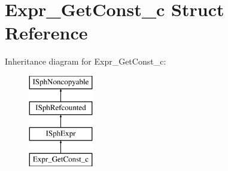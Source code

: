 \hypertarget{structExpr__GetConst__c}{\section{Expr\-\_\-\-Get\-Const\-\_\-c Struct Reference}
\label{structExpr__GetConst__c}
}
Inheritance diagram for Expr\-\_\-\-Get\-Const\-\_\-c\-:\begin{figure}[H]
\begin{center}
\leavevmode
\includegraphics[height=4.000000cm]{structExpr__GetConst__c}
\end{center}
\end{figure}
